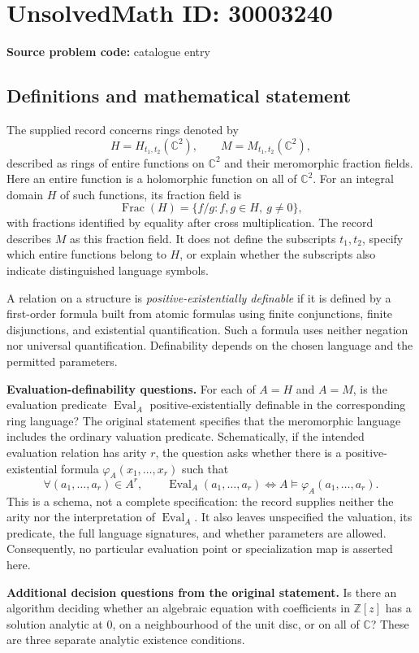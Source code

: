 \documentclass[11pt]{article}
\newcommand{\Z}{\mathbb{Z}}
\newcommand{\C}{\mathbb{C}}
\begin{document}
\section*{UnsolvedMath ID: 30003240}
\textbf{Source problem code:} catalogue entry
\subsection{Definitions and mathematical statement}
The supplied record concerns rings denoted by
\[
H=H_{t_1,t_2}(\C^2),\qquad M=M_{t_1,t_2}(\C^2),
\]
described as rings of entire functions on \(\C^2\) and their meromorphic fraction fields. Here an entire function is a holomorphic function on all of \(\C^2\). For an integral domain \(H\) of such functions, its fraction field is
\[
\operatorname{Frac}(H)=\{f/g:f,g\in H,\ g\ne0\},
\]
with fractions identified by equality after cross multiplication. The record describes \(M\) as this fraction field. It does not define the subscripts \(t_1,t_2\), specify which entire functions belong to \(H\), or explain whether the subscripts also indicate distinguished language symbols.

A relation on a structure is \emph{positive-existentially definable} if it is defined by a first-order formula built from atomic formulas using finite conjunctions, finite disjunctions, and existential quantification. Such a formula uses neither negation nor universal quantification. Definability depends on the chosen language and the permitted parameters.

\textbf{Evaluation-definability questions.} For each of \(A=H\) and \(A=M\), is the evaluation predicate \(\operatorname{Eval}_A\) positive-existentially definable in the corresponding ring language? The original statement specifies that the meromorphic language includes the ordinary valuation predicate. Schematically, if the intended evaluation relation has arity \(r\), the question asks whether there is a positive-existential formula \(\varphi_A(x_1,\ldots,x_r)\) such that
\[
\forall(a_1,\ldots,a_r)\in A^r,\qquad
\operatorname{Eval}_A(a_1,\ldots,a_r)
\Longleftrightarrow
A\models\varphi_A(a_1,\ldots,a_r).
\]
This is a schema, not a complete specification: the record supplies neither the arity nor the interpretation of \(\operatorname{Eval}_A\). It also leaves unspecified the valuation, its predicate, the full language signatures, and whether parameters are allowed. Consequently, no particular evaluation point or specialization map is asserted here.

\textbf{Additional decision questions from the original statement.} Is there an algorithm deciding whether an algebraic equation with coefficients in \(\Z[z]\) has a solution analytic at \(0\), on a neighbourhood of the unit disc, or on all of \(\C\)? These are three separate analytic existence conditions.
\end{document}
